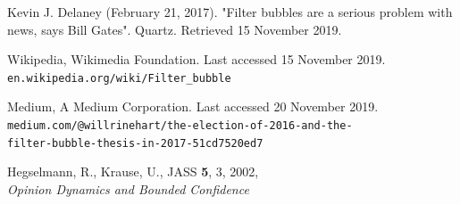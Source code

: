 \documentclass[11pt]{article}
\begin{document}
\begin{thebibliography}{9}
     Kevin J. Delaney (February 21, 2017). "Filter bubbles are a serious problem with news, says Bill Gates". Quartz. Retrieved 15 November 2019.
    
     Wikipedia, Wikimedia Foundation. Last accessed 15 November 2019.\\\texttt{en.wikipedia.org/wiki/Filter\_bubble}
    
    Medium, A Medium Corporation. Last accessed 20 November 2019.\\ \texttt{medium.com/@willrinehart/the-election-of-2016-and-the-\\filter-bubble-thesis-in-2017-51cd7520ed7}
    
    Hegselmann, R., Krause, U., JASS \textbf{5}, 3, 2002,\\
    \textit{Opinion Dynamics and Bounded Confidence}
    
\end{thebibliography}

\newpage

\appendix

\end{document}
